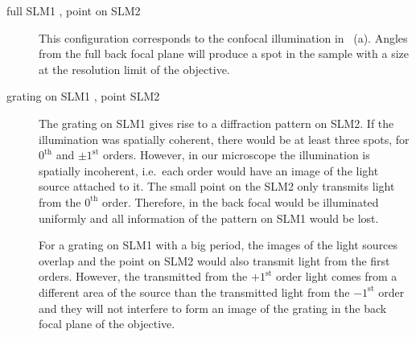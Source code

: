 \begin{description}
\item[full SLM1 , point on SLM2 ] This
  configuration corresponds to the confocal illumination in
  ~(a). Angles from the full back focal
  plane will produce a spot in the sample with a size at the
  resolution limit of the objective.
\item[grating on SLM1 , point SLM2 ] The
  grating on SLM1 gives rise to a diffraction pattern on SLM2. If the
  illumination was spatially coherent, there would be at least three
  spots, for $0^\textrm{th}$ and $\pm1^\textrm{st}$ orders. However,
  in our microscope the illumination is spatially incoherent, i.e.\
  each order would have an image of the light source attached to it.
  The small point on the SLM2 only transmits light from the
  $0^\textrm{th}$ order. Therefore, in the back focal would be
  illuminated uniformly and all information of the pattern on SLM1
  would be lost.
  
  For a grating on SLM1 with a big period, the images of the light
  sources overlap and the point on SLM2 would also transmit light from
  the first orders. However, the transmitted from the $+1^\textrm{st}$
  order light comes from a different area of the source than the
  transmitted light from the $-1^\textrm{st}$ order and they will not
  interfere to form an image of the grating in the back focal plane of
  the objective.


\end{description}
